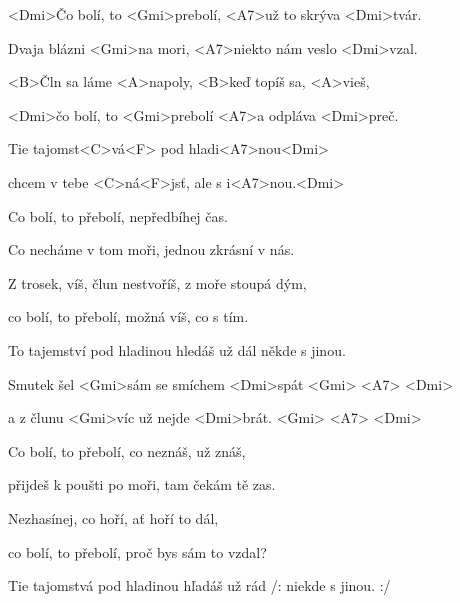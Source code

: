 

\zs
<Dmi>Čo bolí, to <Gmi>prebolí, <A7>už to skrýva <Dmi>tvár.

Dvaja blázni <Gmi>na mori, <A7>niekto nám veslo <Dmi>vzal. 

<B>Čln sa láme <A>napoly, <B>keď topíš sa, <A>vieš, 

<Dmi>čo bolí, to <Gmi>prebolí <A7>a odpláva <Dmi>preč. 
\ks

\zr
Tie tajomst<C>vá<F> pod hladi<A7>nou<Dmi>

chcem v tebe <C>ná<F>jsť, ale s i<A7>nou.<Dmi> 
\kr

\zs
Co bolí, to přebolí, nepředbíhej čas.

Co necháme v tom moři, jednou zkrásní v nás. 

Z trosek, víš, člun nestvoříš, z moře stoupá dým, 

co bolí, to přebolí, možná víš, co s tím. 
\ks
 
\zr
To tajemství pod hladinou hledáš už dál někde s jinou. 
\kr
 
\zs
Smutek šel <Gmi>sám se smíchem <Dmi>spát <Gmi> <A7> <Dmi>

a z člunu <Gmi>víc už nejde <Dmi>brát. <Gmi> <A7> <Dmi>
\ks

\zs
Co bolí, to přebolí, co neznáš, už znáš, 

přijdeš k poušti po moři, tam čekám tě zas. 

Nezhasínej, co hoří, ať hoří to dál, 

co bolí, to přebolí, proč bys sám to vzdal? 
\ks

\zr
Tie tajomstvá pod hladinou hľadáš už rád /: niekde s jinou. :/
\kr

\kp
